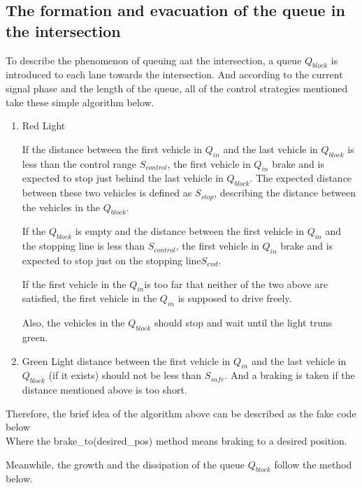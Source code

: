 \documentclass[a4paper,UTF8]{paper}
\begin{document}
\subsection{The formation and evacuation of the queue in the intersection}
\label{section:feq}
To describe the phenomenon of queuing aat the intersection, a queue $Q_{block}$ is introduced to each lane towards the intersection. And according to the current signal phase and the length of the queue, all of the control strategies mentioned take these simple algorithm below.
\begin{enumerate}
\item Red Light

If the distance between the first vehicle in $Q_{in}$ and the last vehicle in $Q_{block}$ is less than the control range $S_{control}$, the first vehicle in $Q_{in}$ brake and is expected to stop just behind the last vehicle in $Q_{block}$. The expected distance between these two vehicles is defined as $S_{stop}$, describing the distance between the vehicles in the $Q_{block}$. 

If the $Q_{block}$ is empty and the distance between the first vehicle in $Q_{in}$ and the stopping line is less than $S_{control}$, the first vehicle in $Q_{in}$ brake and is expected to stop just on the stopping line$S_{end}$.

If the first vehicle in the $Q_{in}$is too far that neither of the two above are satisfied, the first vehicle in the $Q_{in}$ is supposed to drive freely.

Also, the vehicles in the $Q_{block}$ should stop and wait until the light truns green.
\item Green Light
distance between the first vehicle in $Q_{in}$ and the last vehicle in $Q_{block}$ (if it exists) should not be less than $S_{safe}$. And a braking is taken if the distance mentioned above is too short.
\end{enumerate}
Therefore, the brief idea of the algorithm above can be described as the fake code below\\ 



Where the brake\_to(desired\_pos) method means braking to a desired position.

Meanwhile, the growth and the dissipation of the queue $Q_{block}$ follow the method below.
\end{document}
